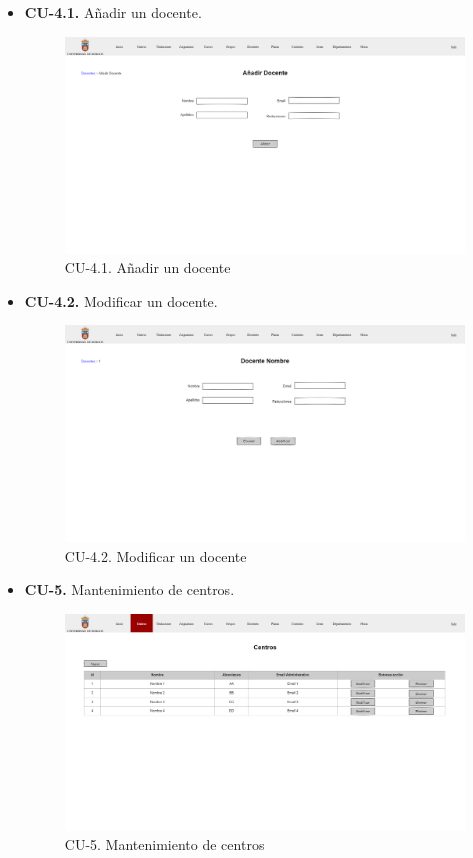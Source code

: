 \begin{itemize}
	\item \textbf{CU-4.1.} Añadir un docente.
	\begin{figure}[!h]
		\centering
		\includegraphics[width=\textwidth]{../img/Anexos/Vistas/add_docente.png}
		\caption{CU-4.1. Añadir un docente}\label{fig:../img/Anexos/Vistas/add_docente.png}
	\end{figure}
	
	\item \textbf{CU-4.2.} Modificar un docente.
	\begin{figure}[!h]
		\centering
		\includegraphics[width=\textwidth]{../img/Anexos/Vistas/mod_docente.png}
		\caption{CU-4.2. Modificar un docente}\label{fig:../img/Anexos/Vistas/mod_docente.png}
	\end{figure}
	
	\item \textbf{CU-5.} Mantenimiento de centros.
	\begin{figure}[!h]
		\centering
		\includegraphics[width=\textwidth]{../img/Anexos/Vistas/centros.png}
		\caption{CU-5. Mantenimiento de centros}\label{fig:../img/Anexos/Vistas/centros.png}
	\end{figure}
	

\end{itemize}
